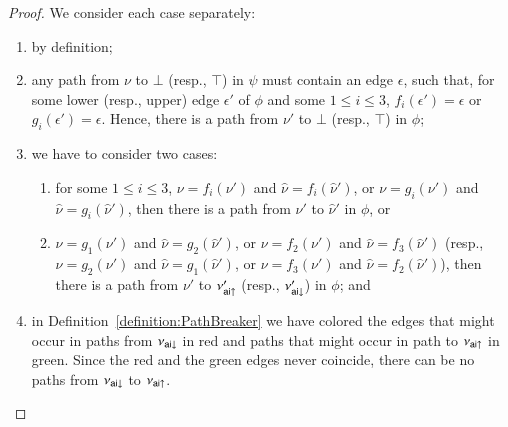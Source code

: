 \begin{proof}
We consider each case separately:
\begin{enumerate}
  \item by definition;
  \item any path from $\nu$ to $\bot$ (resp., $\top$) in $\psi$ must contain an edge $\epsilon$, such that, for some lower (resp., upper) edge $\epsilon'$ of $\phi$ and some $1\le i\le 3$, $f_i(\epsilon')=\epsilon$ or $g_i(\epsilon')=\epsilon$. Hence, there is a path from $\nu'$ to $\bot$ (resp., $\top$) in $\phi$;
  \item we have to consider two cases:
  \begin{enumerate}
    \item for some $1\le i\le 3$, $\nu=f_i(\nu')$ and $\hat\nu=f_i(\hat\nu')$, or $\nu=g_i(\nu')$ and $\hat\nu=g_i(\hat\nu')$, then there is a path from $\nu'$ to $\hat\nu'$ in $\phi$, or
    \item $\nu=g_1(\nu')$ and $\hat\nu=g_2(\hat\nu')$, or $\nu=f_2(\nu')$ and $\hat\nu=f_3(\hat\nu')$ (resp., $\nu=g_2(\nu')$ and $\hat\nu=g_1(\hat\nu')$, or $\nu=f_3(\nu')$ and $\hat\nu=f_2(\hat\nu')$), then there is a path from $\nu'$ to $\nu'_{{\mathsf{ai}}{\uparrow}}$ (resp., $\nu'_{{\mathsf{ai}}{\downarrow}}$) in $\phi$; and
  \end{enumerate}
  \item in Definition~\ref{definition:PathBreaker} we have colored the edges that might occur in paths from $\nu_{{\mathsf{ai}}{\downarrow}}$ in red and paths that might occur in path to $\nu_{{\mathsf{ai}}{\uparrow}}$ in green. Since the red and the green edges never coincide, there can be no paths from $\nu_{{\mathsf{ai}}{\downarrow}}$ to $\nu_{{\mathsf{ai}}{\uparrow}}$.
\end{enumerate}
\end{proof}

